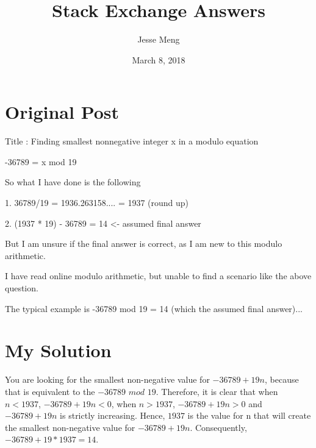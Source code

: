 \documentclass{article}
\title{Stack Exchange Answers}
\author{Jesse Meng }
\date{March 8, 2018}
\begin{document}
\maketitle

\section{Original Post}
Title : Finding smallest nonnegative integer x in a modulo equation

-36789 = x mod 19

So what I have done is the following

1.  36789/19 = 1936.263158.... 
             = 1937 (round up)

2.  (1937 * 19) - 36789 = 14 <- assumed final answer

But I am unsure if the final answer is correct, as I am new to this modulo arithmetic.

I have read online modulo arithmetic, but unable to find a scenario like the above question.

The typical example is -36789 mod 19 = 14 (which the assumed final answer)... 
\section{My Solution}
You are looking for the smallest non-negative value for $-36789+19n$, because that is equivalent to the $-36789$ $mod$ $19$. Therefore, it is clear that when $n<1937$, $-36789+19n <0$, when $n>1937$, $-36789+19n >0$ and $-36789+19n$  is strictly increasing. Hence, $1937$ is the value for n that will create the smallest non-negative value for $-36789+19n$. Consequently, $-36789+19*1937=14$.
\end{document}
